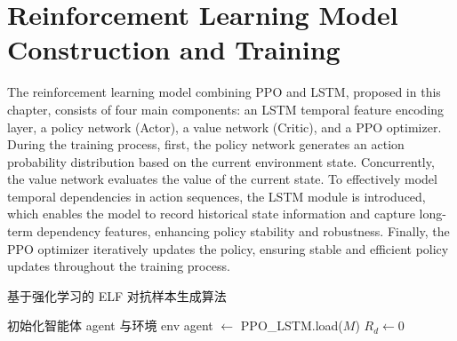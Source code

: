 \section{Reinforcement Learning Model Construction and Training}

The reinforcement learning model combining PPO and LSTM, proposed in this chapter, consists of four main components: an LSTM temporal feature encoding layer, a policy network (Actor), a value network (Critic), and a PPO optimizer. During the training process, first, the policy network generates an action probability distribution based on the current environment state. Concurrently, the value network evaluates the value of the current state. To effectively model temporal dependencies in action sequences, the LSTM module is introduced, which enables the model to record historical state information and capture long-term dependency features, enhancing policy stability and robustness. Finally, the PPO optimizer iteratively updates the policy, ensuring stable and efficient policy updates throughout the training process.

\begin{algorithm}[htbp]
	\caption{基于强化学习的 ELF 对抗样本生成算法}
	初始化智能体 agent 与环境 env\;
	agent $\leftarrow$ PPO\_LSTM.load($M$)\;
	$R_d \leftarrow 0$\;
\end{algorithm}

